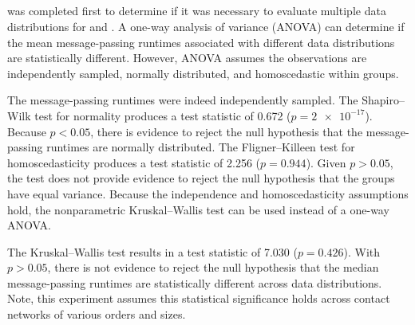 \subsection{}

 was completed first to determine if it was necessary to evaluate multiple data distributions for  and . A one-way analysis of variance (ANOVA) can determine if the mean message-passing runtimes associated with different data distributions are statistically different. However, ANOVA assumes the observations are independently sampled, normally distributed, and homoscedastic within groups.

The message-passing runtimes were indeed independently sampled. The Shapiro--Wilk test for normality \cite{Shapiro1965} produces a test statistic of \num{0.672} ($p=\num{2e-17}$). Because $p < \num{0.05}$, there is evidence to reject the null hypothesis that the message-passing runtimes are normally distributed.
The Fligner--Killeen test \cite{Fligner1976} for homoscedasticity produces a test statistic of \num{2.256} ($p = \num{0.944}$). Given $p > \num{0.05}$, the test does not provide evidence to reject the null hypothesis that the groups have equal variance. Because the independence and homoscedasticity assumptions hold, the nonparametric Kruskal--Wallis test \cite{Kruskal1952} can be used instead of a one-way ANOVA.

The Kruskal--Wallis test results in a test statistic of \num{7.030} ($p=\num{0.426}$). With $p > \num{0.05}$, there is not evidence to reject the null hypothesis that the median message-passing runtimes are statistically different across data distributions. Note, this experiment assumes this statistical significance holds across contact networks of various orders and sizes.

